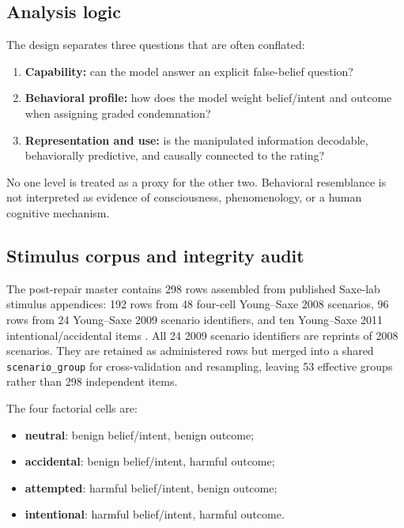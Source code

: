 \documentclass[11pt]{article}
\begin{document}
\subsection{Analysis logic}

The design separates three questions that are often conflated:
\begin{enumerate}[leftmargin=*]
    \item \textbf{Capability:} can the model answer an explicit false-belief question?
    \item \textbf{Behavioral profile:} how does the model weight belief/intent and outcome when assigning graded condemnation?
    \item \textbf{Representation and use:} is the manipulated information decodable, behaviorally predictive, and causally connected to the rating?
\end{enumerate}
No one level is treated as a proxy for the other two.
Behavioral resemblance is not interpreted as evidence of consciousness, phenomenology, or a human cognitive mechanism.

\subsection{Stimulus corpus and integrity audit}

The post-repair master contains 298 rows assembled from published Saxe-lab stimulus appendices: 192 rows from 48 four-cell Young--Saxe 2008 scenarios, 96 rows from 24 Young--Saxe 2009 scenario identifiers, and ten Young--Saxe 2011 intentional/accidental items \citep{young2008belief,young2009innocent,young2011ignorance}.
All 24 2009 scenario identifiers are reprints of 2008 scenarios.
They are retained as administered rows but merged into a shared \texttt{scenario\_group} for cross-validation and resampling, leaving 53 effective groups rather than 298 independent items.

The four factorial cells are:
\begin{itemize}[leftmargin=*]
    \item \textbf{neutral}: benign belief/intent, benign outcome;
    \item \textbf{accidental}: benign belief/intent, harmful outcome;
    \item \textbf{attempted}: harmful belief/intent, benign outcome;
    \item \textbf{intentional}: harmful belief/intent, harmful outcome.
\end{itemize}
\end{document}
